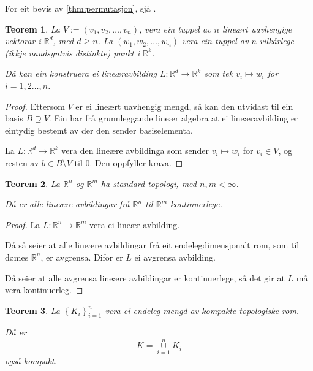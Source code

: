 \documentclass[a4paper, 12pt, norsk]{article}
\theoremstyle{plain}
\newtheorem{theorem}{Teorem}[section]
\theoremstyle{definition}
\newcommand{\Rb}{\mathbb{R}}
\newcommand{\union}{ \mathop{\cup}\limits }
\newcommand{\set}[1]{ \left\{ #1 \right\} } %
\newcommand{\tuple}[1]{ \left( #1 \right) } %
\begin{document}
For eit bevis av \autoref{thm:permutasjon}, sjå \cite[s. 130]{MR1304051}.

\begin{theorem} \label{thm:definer-lin-op}
	La \( V := \tuple{v_1, v_2, \dots, v_n} \), vera ein tuppel av \( n \) lineært uavhengige vektorar i \( \Rb^d \), med \( d \geq n \). La \( \tuple{w_1, w_2, \dots, w_n} \) vera ein tuppel av \( n \) vilkårlege (ikkje naudsyntvis distinkte) punkt i \( \Rb^k \).
	
	Då kan ein konstruera ei lineæravbilding \( L : \Rb^d \to \Rb^k \) som tek \( v_i \mapsto w_i \) for \( i = 1, 2 \dots, n \).
\end{theorem}

\begin{proof}
	Ettersom \( V \) er ei lineært uavhengig mengd, så kan den utvidast til ein basis \( B \supseteq V \). Ein har frå grunnleggande lineær algebra at ei lineæravbilding er eintydig bestemt av der den sender basiselementa.

	La \( L : \Rb^d \to \Rb^k \) vera den lineære avbildinga som sender \( v_i \mapsto w_i \) for \( v_i \in V \), og resten av \( b \in B \setminus V \) til \( 0 \). Den oppfyller krava.
\end{proof}

\begin{theorem} \label{thm:avgrensa-lin-op-er-kont}
	La \( \Rb^n \) og \( \Rb^m \) ha standard topologi, med \( n, m < \infty \).

	Då er alle lineære avbildingar frå \( \Rb^n \) til \( \Rb^m \) kontinuerlege.
\end{theorem}

\begin{proof}
	La \( L : \Rb^n \to \Rb^m \) vera ei lineær avbilding.

	Då så seier \cite[Theroem 6.3.1]{MR3838450} at alle lineære avbildingar frå eit endelegdimensjonalt rom, som til dømes \( \Rb^n \), er avgrensa. Difor er \( L \) ei avgrensa avbilding.

	Då seier \cite[Theorem 6.4.1]{MR3838450} at alle avgrensa lineære avbildingar er kontinuerlege, så det gir at \( L \) må vera kontinuerleg.
\end{proof}

\begin{theorem} \label{thm:endeleg-union-kompakt-er-kompakt}
	La \( \set{K_i}_{i = 1}^n \) vera ei endeleg mengd av kompakte topologiske rom. 
	
	Då er
	\[
		K = \union_{i=1}^n K_i
	\]
	også kompakt.
\end{theorem}
\end{document}

